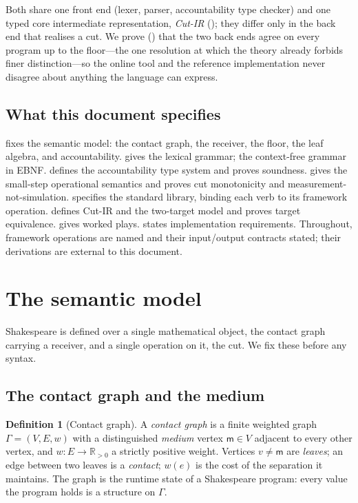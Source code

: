 \documentclass[11pt,a4paper]{article}
\theoremstyle{thmstyle}
\theoremstyle{definition}
\newtheorem{definition}[theorem]{Definition}
\theoremstyle{remark}
\newcommand{\R}{\mathbb{R}}
\newcommand{\medium}{\mathsf{m}}
\begin{document}
Both share one front end (lexer, parser, accountability type checker) and
one typed core intermediate representation, \emph{Cut-IR}
(); they differ only in the back end that realises a cut. We
prove () that the two back ends agree on every
program up to the floor---the one resolution at which the theory already
forbids finer distinction---so the online tool and the reference
implementation never disagree about anything the language can express.

\subsection{What this document specifies}

 fixes the semantic model: the contact graph, the
receiver, the floor, the leaf algebra, and accountability.
 gives the lexical grammar;  the
context-free grammar in EBNF.  defines the accountability
type system and proves soundness.  gives the small-step
operational semantics and proves cut monotonicity and
measurement-not-simulation.  specifies the standard
library, binding each verb to its framework operation. 
defines Cut-IR and the two-target model and proves target equivalence.
 gives worked plays.  states
implementation requirements. Throughout, framework operations are named and
their input/output contracts stated; their derivations are external to
this document.

\section{The semantic model}
\label{sec:model}

Shakespeare is defined over a single mathematical object, the contact
graph carrying a receiver, and a single operation on it, the cut. We fix
these before any syntax.

\subsection{The contact graph and the medium}

\begin{definition}[Contact graph]
\label{def:contact-graph}
A \emph{contact graph} is a finite weighted graph $\Gamma=(V,E,w)$ with a
distinguished \emph{medium} vertex $\medium\in V$ adjacent to every other
vertex, and $w\colon E\to\R_{>0}$ a strictly positive weight. Vertices
$v\neq\medium$ are \emph{leaves}; an edge between two leaves is a
\emph{contact}; $w(e)$ is the cost of the separation it maintains. The
graph is the runtime state of a Shakespeare program: every value the
program holds is a structure on $\Gamma$.
\end{definition}
\end{document}
